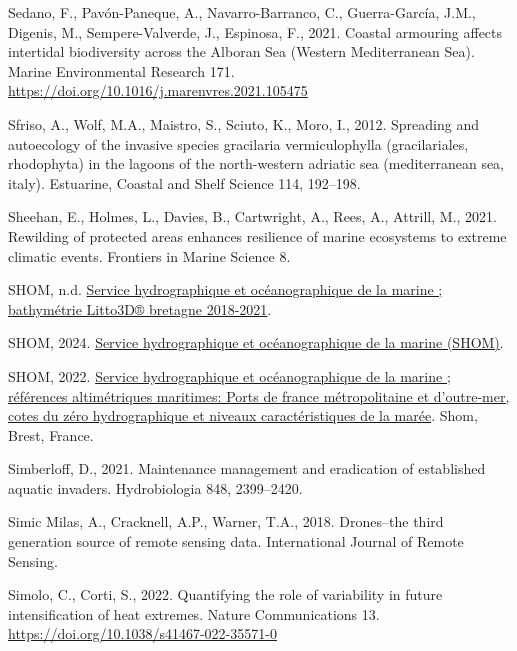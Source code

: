 \documentclass[
  letterpaper,
  11pt,
  english,
  singlespacing,
  headsepline]{MastersDoctoralThesis}
\newlength{\cslhangindent}
\newenvironment{CSLReferences}[2] %
 {\begin{list}{}{%
  \setlength{\itemindent}{0pt}
  \setlength{\leftmargin}{0pt}
  \setlength{\parsep}{0pt}
  \ifodd #1
   \setlength{\leftmargin}{\cslhangindent}
   \setlength{\itemindent}{-1\cslhangindent}
  \fi
  \setlength{\itemsep}{#2\baselineskip}}}
 {\end{list}}
\begin{document}
\begin{CSLReferences}{1}{0}
Sedano, F., Pavón-Paneque, A., Navarro-Barranco, C., Guerra-García,
J.M., Digenis, M., Sempere-Valverde, J., Espinosa, F., 2021. {Coastal
armouring affects intertidal biodiversity across the Alboran Sea
(Western Mediterranean Sea)}. Marine Environmental Research 171.
\url{https://doi.org/10.1016/j.marenvres.2021.105475}

Sfriso, A., Wolf, M.A., Maistro, S., Sciuto, K., Moro, I., 2012.
Spreading and autoecology of the invasive species gracilaria
vermiculophylla (gracilariales, rhodophyta) in the lagoons of the
north-western adriatic sea (mediterranean sea, italy). Estuarine,
Coastal and Shelf Science 114, 192--198.

Sheehan, E., Holmes, L., Davies, B., Cartwright, A., Rees, A., Attrill,
M., 2021. Rewilding of protected areas enhances resilience of marine
ecosystems to extreme climatic events. Frontiers in Marine Science 8.

SHOM, n.d.
\href{https://services.data.shom.fr/geonetwork/srv/fre/catalog.search\#/metadata/BATHYMETRIE_LITTO3D_BZH_2018_2021.xml}{Service
hydrographique et océanographique de la marine ; bathymétrie Litto3D®
bretagne 2018-2021}.

SHOM, 2024. \href{https://www.shom.fr}{Service hydrographique et
océanographique de la marine (SHOM)}.

SHOM, 2022.
\href{https://diffusion.shom.fr/references-altimetriques-maritimes-ram.html}{Service
hydrographique et océanographique de la marine ; références
altimétriques maritimes: Ports de france métropolitaine et d'outre-mer,
cotes du zéro hydrographique et niveaux caractéristiques de la marée}.
Shom, Brest, France.

Simberloff, D., 2021. Maintenance management and eradication of
established aquatic invaders. Hydrobiologia 848, 2399--2420.

Simic Milas, A., Cracknell, A.P., Warner, T.A., 2018. Drones--the third
generation source of remote sensing data. International Journal of
Remote Sensing.

Simolo, C., Corti, S., 2022. Quantifying the role of variability in
future intensification of heat extremes. Nature Communications 13.
\url{https://doi.org/10.1038/s41467-022-35571-0}


\end{CSLReferences}
\end{document}
